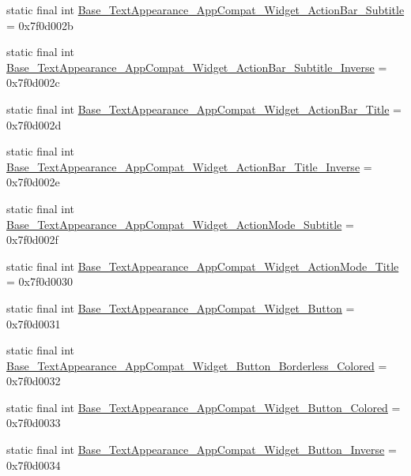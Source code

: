 \begin{DoxyCompactItemize}
\item 
static final int \mbox{\hyperlink{classandroid_1_1support_1_1design_1_1_r_1_1style_af9dc756dbf9823a4e711f295a3ce6756}{Base\+\_\+\+Text\+Appearance\+\_\+\+App\+Compat\+\_\+\+Widget\+\_\+\+Action\+Bar\+\_\+\+Subtitle}} = 0x7f0d002b
\item 
static final int \mbox{\hyperlink{classandroid_1_1support_1_1design_1_1_r_1_1style_afb0b9a877ffad2046b76360f7e097b50}{Base\+\_\+\+Text\+Appearance\+\_\+\+App\+Compat\+\_\+\+Widget\+\_\+\+Action\+Bar\+\_\+\+Subtitle\+\_\+\+Inverse}} = 0x7f0d002c
\item 
static final int \mbox{\hyperlink{classandroid_1_1support_1_1design_1_1_r_1_1style_a86a9497cb9bcb3081388140593c9d85b}{Base\+\_\+\+Text\+Appearance\+\_\+\+App\+Compat\+\_\+\+Widget\+\_\+\+Action\+Bar\+\_\+\+Title}} = 0x7f0d002d
\item 
static final int \mbox{\hyperlink{classandroid_1_1support_1_1design_1_1_r_1_1style_adbb28d8e89e3fb18c87e64d10b2a224e}{Base\+\_\+\+Text\+Appearance\+\_\+\+App\+Compat\+\_\+\+Widget\+\_\+\+Action\+Bar\+\_\+\+Title\+\_\+\+Inverse}} = 0x7f0d002e
\item 
static final int \mbox{\hyperlink{classandroid_1_1support_1_1design_1_1_r_1_1style_a220c2b93853663f129a3a4fed0f413ac}{Base\+\_\+\+Text\+Appearance\+\_\+\+App\+Compat\+\_\+\+Widget\+\_\+\+Action\+Mode\+\_\+\+Subtitle}} = 0x7f0d002f
\item 
static final int \mbox{\hyperlink{classandroid_1_1support_1_1design_1_1_r_1_1style_a2ac186a582133b18d51ae89caf3ea5db}{Base\+\_\+\+Text\+Appearance\+\_\+\+App\+Compat\+\_\+\+Widget\+\_\+\+Action\+Mode\+\_\+\+Title}} = 0x7f0d0030
\item 
static final int \mbox{\hyperlink{classandroid_1_1support_1_1design_1_1_r_1_1style_ae167becff54797daa37aa8e81fc5d6c8}{Base\+\_\+\+Text\+Appearance\+\_\+\+App\+Compat\+\_\+\+Widget\+\_\+\+Button}} = 0x7f0d0031
\item 
static final int \mbox{\hyperlink{classandroid_1_1support_1_1design_1_1_r_1_1style_a80226a53e4097429c183970d719b7384}{Base\+\_\+\+Text\+Appearance\+\_\+\+App\+Compat\+\_\+\+Widget\+\_\+\+Button\+\_\+\+Borderless\+\_\+\+Colored}} = 0x7f0d0032
\item 
static final int \mbox{\hyperlink{classandroid_1_1support_1_1design_1_1_r_1_1style_a6a73ddf9c801684410a290954b07e9fa}{Base\+\_\+\+Text\+Appearance\+\_\+\+App\+Compat\+\_\+\+Widget\+\_\+\+Button\+\_\+\+Colored}} = 0x7f0d0033
\item 
static final int \mbox{\hyperlink{classandroid_1_1support_1_1design_1_1_r_1_1style_a9b290b654323f5f57c9e29efda48226f}{Base\+\_\+\+Text\+Appearance\+\_\+\+App\+Compat\+\_\+\+Widget\+\_\+\+Button\+\_\+\+Inverse}} = 0x7f0d0034

\end{DoxyCompactItemize}
